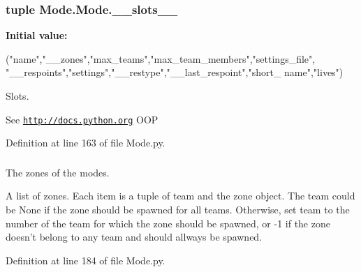 \hypertarget{class_mode_1_1_mode_a6f65d9a9362971bd8896a81a0d71c642}{
\subsubsection[{\_\-\_\-slots\_\-\_\-}]{\setlength{\rightskip}{0pt plus 5cm}tuple {\bf Mode.Mode.\_\-\_\-slots\_\-\_\-}}}
\label{class_mode_1_1_mode_a6f65d9a9362971bd8896a81a0d71c642}
{\bfseries Initial value:}
\begin{DoxyCode}
("name","__zones","max_teams","max_team_members","settings_file",
                   "__respoints","settings","__restype","__last_respoint","short_
      name","lives")
\end{DoxyCode}


Slots. 

See \href{http://docs.python.org}{\tt http://docs.python.org} OOP 

Definition at line 163 of file Mode.py.

\hypertarget{class_mode_1_1_mode_a0672655c12a3e18e65d084c395d9378c}{
\subsubsection[{\_\-\_\-zones}]{}}
\label{class_mode_1_1_mode_a0672655c12a3e18e65d084c395d9378c}


The zones of the modes. 

A list of zones. Each item is a tuple of team and the zone object. The team could be None if the zone should be spawned for all teams. Otherwise, set team to the number of the team for which the zone should be spawned, or -\/1 if the zone doesn't belong to any team and should allways be spawned. 

Definition at line 184 of file Mode.py.

\hypertarget{class_mode_1_1_mode_a62c4256349100a948a336e4f41e73367}{
\subsubsection[{lives}]{}}
\label{class_mode_1_1_mode_a62c4256349100a948a336e4f41e73367}


